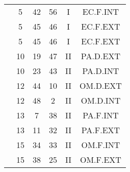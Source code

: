 \documentclass[12pt, a4paper]{article}
\begin{document}
\begin{multicols}{3}
{\begin{tabular}{c c c c c c}
	 	 	 	 & 5 & 42 & 56 & I & EC.F.INT\\%
	 	 	 	 & 5 & 45 & 46 & I & EC.F.EXT\\%
	 	 	 	 & 5 & 45 & 46 & I & EC.F.EXT\\%
	 	 	 	 & 10 & 19 & 47 & II & PA.D.EXT\\%
	 	 	 	 & 10 & 23 & 43 & II & PA.D.INT\\%
	 	 	 	 & 12 & 44 & 10 & II & OM.D.EXT\\%
	 	 	 	 & 12 & 48 & 2 & II & OM.D.INT\\%
	 	 	 	 & 13 & 7 & 38 & II & PA.F.INT\\%
	 	 	 	 & 13 & 11 & 32 & II & PA.F.EXT\\%
	 	 	 	 & 15 & 34 & 33 & II & OM.F.INT\\%
	 	 	 	 & 15 & 38 & 25 & II & OM.F.EXT\\%
	 	 \end{tabular}
 	}
\end{multicols}
\end{document}
